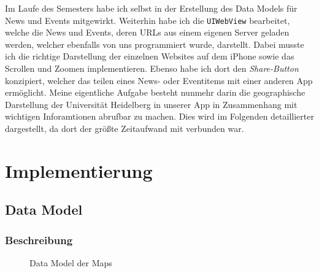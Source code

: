 \documentclass{report}
\begin{document}
Im Laufe des Semesters habe ich selbst in der Erstellung des Data Models für News und Events mitgewirkt. Weiterhin habe ich die \texttt{UIWebView} bearbeitet, welche die News und Events, deren URLs aus einem eigenen Server geladen werden, welcher ebenfalls von uns programmiert wurde, darstellt. Dabei musste ich die richtige Darstellung der einzelnen Websites auf dem iPhone sowie das Scrollen und Zoomen implementieren. Ebenso habe ich dort den \emph{Share-Button} konzipiert, welcher das teilen eines News- oder Eventitems mit einer anderen App ermöglicht. Meine eigentliche Aufgabe besteht nunmehr darin die geographische Darstellung der Universität Heidelberg in unserer App in Zusammenhang mit wichtigen Inforamtionen abrufbar zu machen. Dies wird im Folgenden detaillierter dargestellt, da dort der größte Zeitaufwand mit verbunden war.





\newpage
\chapter{Implementierung}

\section{Data Model}

\subsection{Beschreibung}


\begin{figure}[ht]\label{bild_1}
\centering {}
\caption{Data Model der Maps}
\end{figure}
\end{document}

